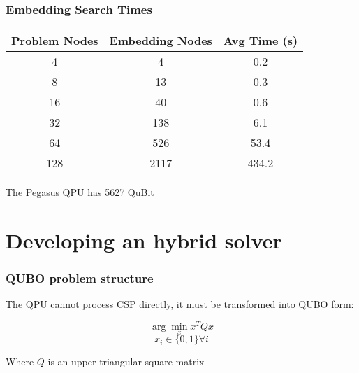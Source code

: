 \documentclass[aspectratio=169]{beamer}
\begin{document}
\begin{frame}\frametitle{Embedding Search Times}

    \begin{table}
        \centering
        \begin{tabular}{c|c|c}
            Problem Nodes & Embedding Nodes & Avg Time (s) \\ \hline
            4 & 4 & 0.2 \\
            8 & 13 & 0.3 \\
            16 & 40 & 0.6 \\
            32 & 138 & 6.1 \\
            64 & 526 & 53.4 \\
            128 & 2117 & 434.2 \\
        \end{tabular}
    \end{table}

    \begin{center}
        The Pegasus QPU has 5627 QuBit
    \end{center}

\end{frame}

\section{Developing an hybrid solver}

\begin{frame}\frametitle{QUBO problem structure}

    The QPU cannot process CSP directly, it must be transformed into QUBO form:

    $$\arg\min_x x^TQx$$
    $$x_i \in \{0, 1\} \forall i$$

    Where $Q$ is an upper triangular square matrix

\end{frame}
\end{document}

